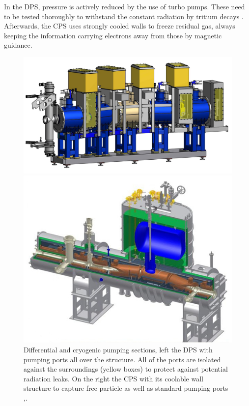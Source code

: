       In the DPS, pressure is actively reduced by the use of turbo pumps. These need to be tested thoroughly to withstand the constant radiation by tritium decays \cite{tritiumTests}. Afterwards, the CPS uses strongly cooled walls to freeze residual gas, always keeping the information carrying electrons away from those by magnetic guidance.
      \begin{figure}
		\begin{minipage}{0.49\textwidth}
				\includegraphics[width = 1.0\textwidth]{graphics/katrinExperiment/DPS.jpg}
		\end{minipage}
		\begin{minipage}{0.49\textwidth}
			\includegraphics[width = 1.0\textwidth]{graphics/katrinExperiment/CPS.jpg}
		\end{minipage}
		\caption[DPS and CPS]{Differential and cryogenic pumping sections, left the DPS with pumping ports all over the structure. All of the ports are isolated against the surroundings (yellow boxes) to protect against potential radiation leaks. On the right the CPS with its coolable wall structure to capture free particle as well as standard pumping ports \cite{DPS},\cite{CPS}.}
      \end{figure}
      
